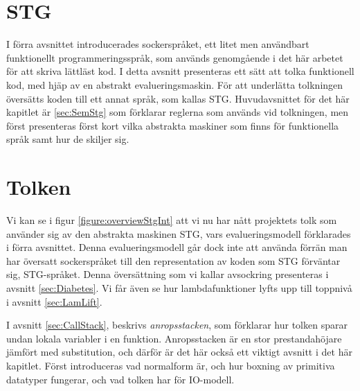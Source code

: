 \documentclass[Rapport]{subfiles}
\begin{document}
\chapter{STG}
\label{sec:Core}
\label{sec:STG}


\overviewStg

I förra avsnittet introducerades sockerspråket, ett litet men användbart
funktionellt programmeringsspråk, som används genomgående i det här
arbetet för att skriva lättläst kod.
    I detta avsnitt presenteras ett sätt att tolka funktionell kod, med hjäp av  
en abstrakt evalueringsmaskin. För att underlätta
tolkningen översätts koden till ett annat språk, som kallas STG. 
Huvudavsnittet för det här kapitlet är \ref{sec:SemStg} %
som förklarar reglerna som används vid tolkningen, men först presenteras först kort
vilka abstrakta maskiner som finns för funktionella språk samt hur de skiljer sig.






\chapter{Tolken}
\label{sec:Tolken}

\overviewStgInt

Vi kan se i figur \ref{figure:overviewStgInt} att vi nu har nått projektets tolk som använder sig av den abstrakta maskinen STG, vars
evalueringsmodell förklarades i förra avsnittet. Denna evalueringsmodell går
dock inte att använda förrän man har översatt
sockerspråket till den representation av koden som STG förväntar sig, STG-språket.
Denna översättning som vi kallar avsockring presenteras i avsnitt \ref{sec:Diabetes}.
Vi får även se hur lambdafunktioner lyfts upp till toppnivå i avsnitt \ref{sec:LamLift}.

I avsnitt \ref{sec:CallStack}, beskrivs \emph{anropsstacken}, som förklarar hur tolken
sparar undan lokala variabler i en funktion. Anropsstacken är en 
stor prestandahöjare jämfört med substitution, och därför är det här också ett
viktigt avsnitt i det här kapitlet. Först introduceras vad normalform är,
och hur boxning av 
primitiva datatyper fungerar, och vad tolken har
för IO-modell.






\end{document}
